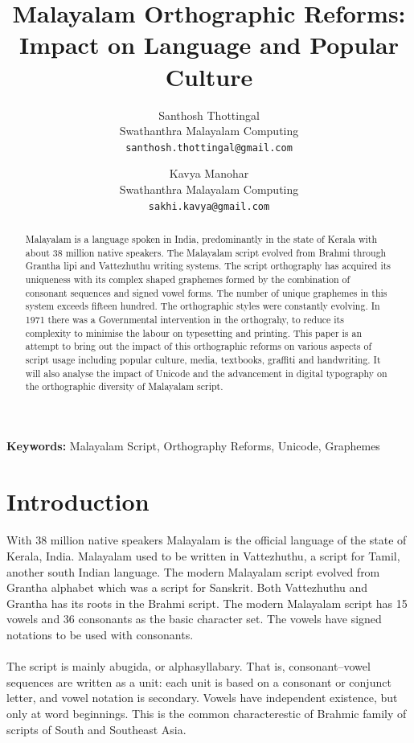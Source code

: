 \documentclass[10pt]{article}
\title{Malayalam Orthographic Reforms: \\Impact on Language and Popular Culture}
\author{Santhosh Thottingal \\
 Swathanthra Malayalam Computing \\
 {\small {\tt santhosh.thottingal@gmail.com}} \\
 \and
 Kavya Manohar \\
 Swathanthra Malayalam Computing \\
 {\small {\tt sakhi.kavya@gmail.com}}}
\begin{document}
\maketitle

\begin{abstract}

Malayalam is a language spoken in India, predominantly in the state of Kerala with about 38 million native speakers. The Malayalam script evolved from Brahmi through Grantha lipi and Vattezhuthu writing systems. The script orthography has acquired its uniqueness with its complex shaped graphemes formed by the combination of consonant sequences and  signed vowel forms. The number of unique graphemes in this system exceeds fifteen hundred. The orthographic styles were constantly evolving. In 1971 there was a Governmental intervention in the orthograhy, to reduce its complexity to minimise the labour on typesetting and printing. This paper is an attempt to bring out the impact of this orthographic reforms on various aspects of script usage including popular culture, media, textbooks, graffiti and handwriting. It will also analyse the impact of Unicode and the advancement in digital typography on the orthographic diversity of Malayalam script.

\end{abstract}
 \textbf{Keywords:} Malayalam Script, Orthography Reforms, Unicode, Graphemes

\section{Introduction}

\paragraph{}

With 38 million native speakers Malayalam is the official language of the state of Kerala, India.  Malayalam used to be written in Vattezhuthu, a script for Tamil, another south Indian language. The modern Malayalam script evolved from Grantha alphabet which was a script for Sanskrit. Both Vattezhuthu and Grantha has its roots in the Brahmi script\cite{}. The modern Malayalam script has 15 vowels and 36 consonants as the basic character set. The vowels have signed notations to be used with consonants.

\paragraph{}
The script is mainly abugida, or alphasyllabary. That is, consonant–vowel sequences are written as a unit: each unit is based on a consonant or conjunct letter, and vowel notation is secondary. Vowels have independent existence, but only at word beginnings. This is the common characterestic of  Brahmic family of scripts of South and Southeast Asia\cite{}.
\end{document}
